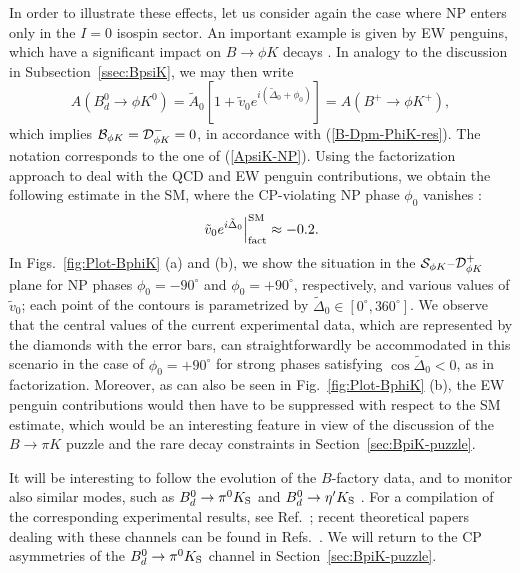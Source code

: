 \documentclass[11pt]{cernrep}
\begin{document}
In order to illustrate these effects, let us consider again the case where NP enters 
only in the $I=0$ isospin sector. An important example is given by EW penguins, 
which have a significant impact on $B\to\phi K$ decays \cite{RF-EWP}. In analogy
to the discussion in Subsection~\ref{ssec:BpsiK}, we may then write
\begin{equation}\label{AphiK-NP}
A(B^0_d\to \phi K^0)=\tilde A_0\left[1+\tilde v_0e^{i(\tilde \Delta_0+\phi_0)}\right]=
A(B^+ \to \phi K^+),
\end{equation}
which implies ${\cal B}_{\phi K} ={\cal D}^-_{\phi K}=0$, in accordance with 
(\ref{B-Dpm-PhiK-res}). The notation corresponds to the one of (\ref{ApsiK-NP}).  
Using the factorization approach to deal with the QCD and EW penguin contributions, 
we obtain the following estimate in the SM, where the CP-violating NP phase
$\phi_0$ vanishes \cite{BFRS3}:
\begin{equation}\label{v-SM-phiK}
\left.\tilde v_0e^{i\tilde \Delta_0}\right|_{\rm fact}^{\rm SM}\approx -0.2.
\end{equation}
In Figs.~\ref{fig:Plot-BphiK} (a) and (b), we show the situation in the 
${\cal S}_{\phi K}$--${\cal D}^+_{\phi K}$ plane for NP phases $\phi_0=-90^\circ$
and $\phi_0=+90^\circ$, respectively, and various values of $\tilde v_0$; each point
of the contours is parametrized by $\tilde\Delta_0\in[0^\circ,360^\circ]$. We observe 
that the central values of the current experimental data, which are represented by the 
diamonds with the error bars, can straightforwardly be accommodated in this scenario 
in the case of $\phi_0=+90^\circ$ for strong phases satisfying $\cos\tilde\Delta_0<0$, 
as in factorization. Moreover, as can also be seen in Fig.~\ref{fig:Plot-BphiK} (b),
the EW penguin contributions would then have to be suppressed with respect
to the SM estimate, which would be an interesting feature in view of the discussion of
the $B\to \pi K$ puzzle and the rare decay constraints in Section~\ref{sec:BpiK-puzzle}.

It will be interesting to follow the evolution of the $B$-factory data,
and to monitor also similar modes, such as $B^0_d\to \pi^0 K_{\rm S}$ 
\cite{PAPIII} and  $B^0_d\to \eta'K_{\rm S}$ \cite{loso}. For a compilation of 
the corresponding experimental results, see Ref.~\cite{HFAG}; recent 
theoretical papers dealing with these channels can be found in 
Refs.~\cite{BFRS2,BFRS3,BFRS-5,GGR,beneke}. We will return to the CP 
asymmetries of the $B^0_d\to \pi^0 K_{\rm S}$ channel in 
Section~\ref{sec:BpiK-puzzle}.
\end{document}
